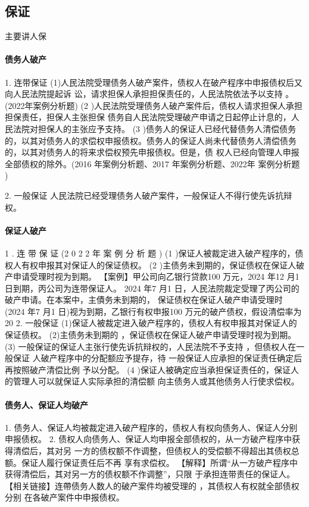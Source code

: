 \documentclass[UTF8,12pt]{ctexart}
\numberwithin{equation}{section} %
\numberwithin{figure}{section}
\numberwithin{table}{section}
\begin{document}
	\subsection{保证}
	主要讲人保
	\paragraph{债务人破产}
	1. 连带保证 (1)人民法院受理债务人破产案件，债权人在破产程序中申报债权后又向人民法院提起诉 讼，请求担保人承担担保责任的，人民法院依法予以支持 。(2022年案例分析题)
	(2 )人民法院受理债务人破产案件后，债权人请求担保人承担担保责任，担保人主张担保 债务自人民法院受理破产申请之日起停止计息的，人民法院对担保人的主张应予支持。
	(3 )债务人的保证人已经代替债务人清偿债务的，以其对债务人的求偿权申报债权。债务人的保证人尚未代替债务人清偿债务的，以其对债务人的将来求偿权预先申报债权。但是，债 权人已经向管理人申报全部债权的除外。(2016 年案例分析题、2017 年案例分析题、2022年 案例分析题 )
	
	2. 一般保证 人民法院已经受理债务人破产案件，一般保证人不得行使先诉抗辩权。
	
	\paragraph{保证人破产}
	1 . 连 带 保 证 (2 0 2 2 年 案 例 分 析 题 )
	(1 )保证人被裁定进入破产程序的，债权人有权申报其对保证人的保证债权。 (2 )主债务未到期的，保证债权在保证人破产申请受理时视为到期。
	【案例】甲公司向乙银行贷款100 万元，2024 年12 月1 日到期，丙公司为连带保证人。 2024 年7 月1 日，人民法院裁定受理了丙公司的破产申请。在本案中，主債务未到期的， 保证债权在保证人破产申请受理时 (2024 年7 月1 日)视为到期，乙银行有权申报100 万元的破产债权，假设清偿率为20%
	2. 一般保证 (1)保证人被裁定进入破产程序的，债权人有权申报其对保证人的保证债权。 (2)主债务未到期的 ，保证债权在保证人破产申请受理时视为到期。
	(3) 一般保证的保证人主张行使先诉抗辩权的，人民法院不予支持 ，但债权人在一般保证 人破产程序中的分配额应予提存，待 一般保证人应承担的保证责任确定后再按照破产清偿比例 予以分配。
	(4 )保证人被确定应当承担保证责任的，保证人的管理人可以就保证人实际承担的清偿额 向主债务人或其他债务人行使求偿权。
	
	\paragraph{债务人、保证人均破产}
	1. 债务人、保证人均被裁定进入破产程序的，债权人有权向债务人、保证人分别申报债权。 
	2. 债权人向债务人、保证人均申报全部债权的，从一方破产程序中获得清偿后，其对另 一方的债权额不作调整，但债权人的受偿额不得超出其债权总额。保证人履行保证责任后不再 享有求偿权。
	【解释】所谓“从一方破产程序中获得清偿后，其对另一方的债权额不作调整”，只限 于承担连带责任的保证人。
	【相关链接】连帶债务人数人的破产案件均被受理的 ，其债权人有权就全部债权分别 在各破产案件中申报债权。
	
\end{document}
